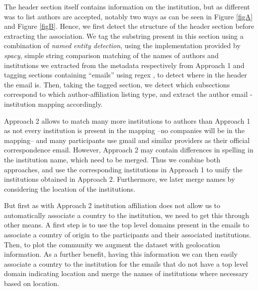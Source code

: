 \documentclass[journal,twocolumn]{IEEEtran}
\begin{document}
The header section itself contains information on the institution, but
as different was to list authors are accepted, notably two ways as can
be seen in Figure \ref{figA} and Figure \ref{figB}. Hence, we first
detect the structure of the header section before extracting the
association. We tag the substring present in this section using a
combination of \emph{named entity detection}, using the implementation
provided by \emph{spacy}, simple string comparison matching of the names
of authors and institutions we extracted from the metadata respectively
from Approach 1 and tagging sections containing ``emails'' using regex ,
to detect where in the header the email is. Then, taking the tagged
section, we detect which subsections correspond to which
author-affiliation listing type, and extract the author email -
institution mapping accordingly.

Approach 2 allows to match many more institutions to authors than
Approach 1 as not every institution is present in the mapping --no
companies will be in the mapping-- and many participants use gmail and
similar providers as their official correspondence email. However,
Approach 2 may contain differences in spelling in the institution name,
which need to be merged. Thus we combine both approaches, and use the
corresponding institutions in Approach 1 to unify the institutions
obtained in Approach 2. Furthermore, we later merge names by considering
the location of the institutions.

But first as with Approach 2 institution affiliation does not allow us
to automatically associate a country to the institution, we need to get
this through other means. A first step is to use the top level domains
present in the emails to associate a country of origin to the
participants and their associated institutions. Then, to plot the
community we augment the dataset with geolocation information. As a
further benefit, having this information we can then easily associate a
country to the institution for the emails that do not have a top level
domain indicating location and merge the names of institutions where
necessary based on location.
\end{document}
